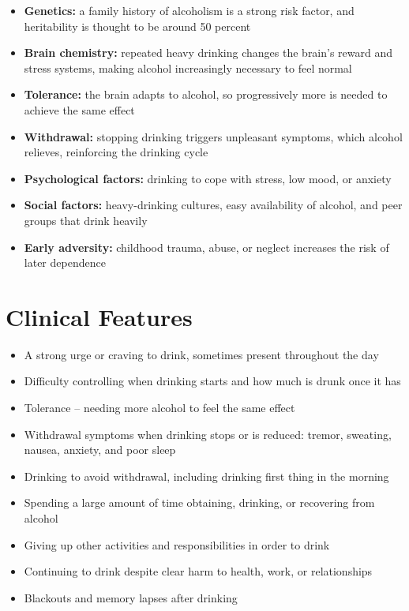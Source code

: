 \begin{itemize}
    \item \textbf{Genetics:} a family history of alcoholism is a strong risk factor, and heritability is thought to be around 50 percent
    \item \textbf{Brain chemistry:} repeated heavy drinking changes the brain's reward and stress systems, making alcohol increasingly necessary to feel normal
    \item \textbf{Tolerance:} the brain adapts to alcohol, so progressively more is needed to achieve the same effect
    \item \textbf{Withdrawal:} stopping drinking triggers unpleasant symptoms, which alcohol relieves, reinforcing the drinking cycle
    \item \textbf{Psychological factors:} drinking to cope with stress, low mood, or anxiety
    \item \textbf{Social factors:} heavy-drinking cultures, easy availability of alcohol, and peer groups that drink heavily
    \item \textbf{Early adversity:} childhood trauma, abuse, or neglect increases the risk of later dependence
\end{itemize}

\section*{Clinical Features}
\begin{itemize}
    \item A strong urge or craving to drink, sometimes present throughout the day
    \item Difficulty controlling when drinking starts and how much is drunk once it has
    \item Tolerance -- needing more alcohol to feel the same effect
    \item Withdrawal symptoms when drinking stops or is reduced: tremor, sweating, nausea, anxiety, and poor sleep
    \item Drinking to avoid withdrawal, including drinking first thing in the morning
    \item Spending a large amount of time obtaining, drinking, or recovering from alcohol
    \item Giving up other activities and responsibilities in order to drink
    \item Continuing to drink despite clear harm to health, work, or relationships
    \item Blackouts and memory lapses after drinking
\end{itemize}

